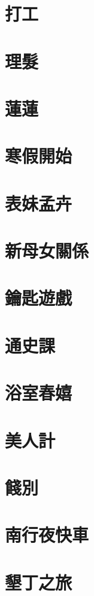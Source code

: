 \documentclass[hyperref]{ctexbook}
\begin{document}
\chapter{打工}
\chapter{理髮}
\chapter{蓮蓮}
\chapter{寒假開始}
\chapter{表妹孟卉}
\chapter{新母女關係}
\chapter{鑰匙遊戲}
\chapter{通史課}
\chapter{浴室春嬉}
\chapter{美人計}
\chapter{餞別}
\chapter{南行夜快車}
\chapter{墾丁之旅}
\end{document}
